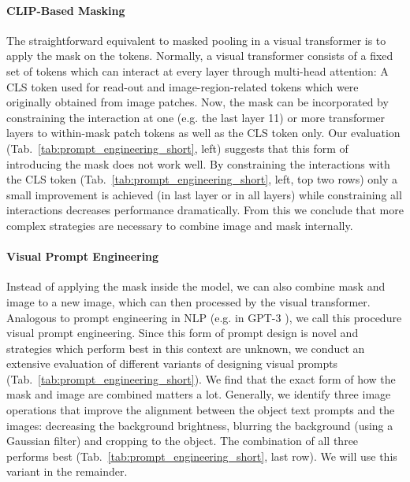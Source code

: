 \documentclass[10pt,twocolumn,letterpaper]{article}
\begin{document}
\paragraph{CLIP-Based Masking}
The straightforward equivalent to masked pooling in a visual transformer is to apply the mask on the tokens. Normally, a visual transformer consists of a fixed set of tokens which can interact at every layer through multi-head attention: A CLS token used for read-out and image-region-related tokens which were originally obtained from image patches. 
Now, the mask can be incorporated by constraining the interaction at one (e.g. the last layer 11) or more transformer layers to within-mask patch tokens as well as the CLS token only.
Our evaluation (Tab.~\ref{tab:prompt_engineering_short}, left) suggests that this form of introducing the mask does not work well. By constraining the interactions with the CLS token (Tab.~\ref{tab:prompt_engineering_short}, left, top two rows) only a small improvement is achieved (in last layer or in all layers) while constraining all interactions decreases performance dramatically. From this we conclude that more complex strategies are necessary to combine image and mask internally.

\paragraph{Visual Prompt Engineering}
Instead of applying the mask inside the model, we can also combine mask and image to a new image, which can then processed by the visual transformer.
Analogous to prompt engineering in NLP (e.g. in GPT-3 \cite{brown20}), we call this procedure visual prompt engineering. Since this form of prompt design is novel and strategies which perform best in this context are unknown, we conduct an extensive evaluation of different variants of designing visual prompts (Tab.~\ref{tab:prompt_engineering_short}).
We find that the exact form of how the mask and image are combined matters a lot. Generally, we identify three image operations that improve the alignment between the object text prompts and the images: decreasing the background brightness, blurring the background (using a Gaussian filter) and cropping to the object. The combination of all three performs best (Tab.~\ref{tab:prompt_engineering_short}, last row). We will use this variant in the remainder.
\end{document}
